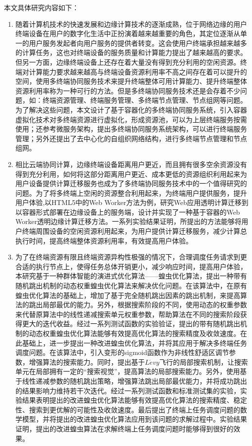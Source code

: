 本文具体研究内容如下：
\begin{enumerate}
    \item 随着计算机技术的快速发展和边缘计算技术的逐渐成熟，位于网络边缘的用户终端设备在用户的数字化生活中正扮演着越来越重要的角色，其定位逐渐从单一的用户服务发起者向用户服务的提供者转变。这会使用户终端承担越来越多的计算任务，这也对终端设备的服务质量和计算能力提出了越来越高的要求。但另一方面，边缘终端设备上还存在着大量没有得到充分利用的空闲资源。终端对计算能力要求越来越高与终端设备资源利用率不高之间存在着可以提升的空间，使用多终端协同服务技术来提升终端整体可用计算能力、提升终端整体资源利用率称为一种可行的方法。但是多终端协同服务技术还是会存着不少问题，如：终端资源管理、终端服务管理、多终端节点管理、节点组网等问题。为了解决这些问题，本文设计了基于容器化的多终端协同服务系统，引入容器虚拟化技术对多终端资源进行虚拟化，形成资源池，可以为上层终端服务按需使用；还参考微服务架构，提出多终端协同服务系统架构，可以进行终端服务管理；另外还提出了去中心化的自组织网络结构，进行多终端节点管理和节点组网。
    \item 相比云端协同计算，边缘终端设备距离用户更近，而且拥有很多空余资源没有得到充分利用，如何将这部分距离用户更近、成本更低的资源组织利用起来为用户设备提供计算迁移服务也成为了多终端协同服务技术中的一个值得研究的问题。为了将多终端上空闲的资源整合利用起来，为终端用户提供服务，提升用户体验,以HTML5中的Web Worker方法为例，研究Web应用透明计算迁移到以容器形式部署在边缘设备上的服务端，设计并实现了一种基于容器的Web Worker透明边缘计算迁移方法。一系列实验结果证明，所提出的方法能够将用户终端周围设备的空闲资源利用起来，为用户提供计算迁移服务，减少计算总执行时间，提高终端整体资源利用率，有效提高用户体验。
    \item 为了在终端资源有限且终端资源异构性极强的情况下，合理调度任务请求到更合适的执行节点上，使得任务总体开销更小，减少响应时间，提高用户体验，本研究基于一种群体智能的演进式优化算法——蝗虫优化算法，提出一种带有随机跳出机制的动态权重蝗虫优化算法来解决优化问题。在该算法中，在原有蝗虫优化算法的基础上，增加了基于完全随机跳出因素的跳出机制，来提高算法的跳出局部最优的能力。另外，根据搜索阶段的不同，使用动态的权重参数来代替原算法中的线性递减搜索单元权重参数，帮助算法在不同的搜索阶段获得更大的迭代收益。经过一系列测试函数的实验验证，提出的带有随机跳出机制的动态权重蝗虫优化算法能够有效提高优化算法的搜索精度及收敛速度。在此基础上，进一步提出一种改进蝗虫优化算法，并将其应用于解决多终端任务调度问题。在该算法中，引入变形的sigmoid函数作为非线性舒适区调节参数，增强算法的搜索能力。同时，提出基于$L\acute{e}vy$飞行的局部搜索机制，让搜索单元在局部拥有一定的“搜索视觉”，提高算法的局部搜索能力。另外，使用基于线性递减参数的随机跳出策略，增强算法跳出局部最优能力，并将成功跳出的结果影响力维持若干次迭代。经过一系列测试函数和标准测试集的实验，实验结果表明提出的改进蝗虫优化算法能够有效提高优化算法的搜索精度、稳定性、搜索到更优解的可能性及收敛速度。最后提出了终端上任务调度问题的数学模型，并将提出的改进蝗虫优化算法应用到该问题的求解过程中。实验结果证明，提出的改进蝗虫算法在求解终端上任务调度问题时能够得到很好的效果。

\end{enumerate}
